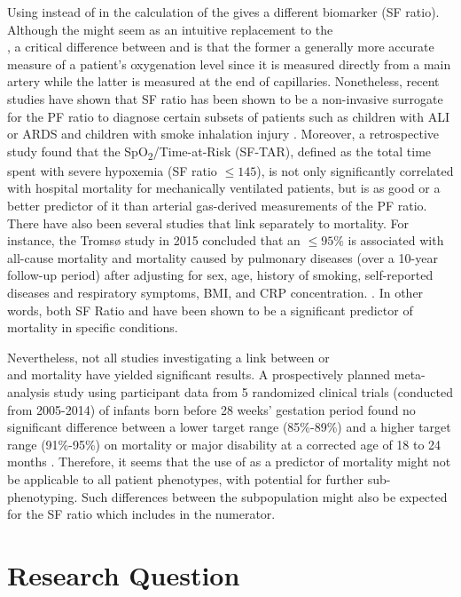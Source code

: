 Using \Sp instead of \Pa in the calculation of the \PF gives a different biomarker \SF (SF ratio). Although the \SF might seem as an intuitive replacement to the \\  \PF, a critical difference between \Pa and \Sp is that the former a generally more accurate measure of a patient's oxygenation level since it is measured directly from a main artery while the latter is measured at the end of capillaries. Nonetheless, recent studies have shown that SF ratio has been shown to be a non-invasive surrogate for the PF ratio to diagnose certain subsets of patients such as children with ALI or ARDS \citep{rice2007comparison} and children with smoke inhalation injury \citep{cambiaso2017correlation}. Moreover, a retrospective study found that the  SpO\textsubscript{2}/\Fi Time-at-Risk (SF-TAR), defined as the total time spent with severe hypoxemia (SF ratio $\leq 145$), is not only significantly correlated with hospital mortality for mechanically ventilated patients, but is as good or a better predictor of it than arterial gas-derived measurements of the PF ratio. There have also been several studies that link \Sp separately to mortality. For instance, the Tromsø study in 2015 concluded that an \Sp $\leq95\%$ is associated with all-cause mortality and mortality caused by pulmonary diseases (over a 10-year follow-up period) after adjusting for sex, age, history of smoking, self-reported diseases and respiratory symptoms, BMI, and CRP concentration. \citep{vold2015low}. In other words, both SF Ratio and \Sp have been shown to be a significant predictor of mortality in specific conditions. 

Nevertheless, not all studies investigating a link between \Sp or \\ \SF and mortality have yielded significant results. A prospectively planned meta-analysis study using participant data from 5 randomized clinical trials (conducted from 2005-2014) of infants born before 28 weeks' gestation period found no significant difference between a lower \Sp target range (85\%-89\%) and a higher \Sp target range (91\%-95\%) on mortality or major disability at a corrected age of 18 to 24 months \citep{askie2018association}. Therefore, it seems that the use of \Sp as a predictor of mortality might not be applicable to all patient phenotypes, with potential for further sub-phenotyping. Such differences between the subpopulation might also be expected for the SF ratio which includes \Sp in the numerator. 


\section{Research Question} 

